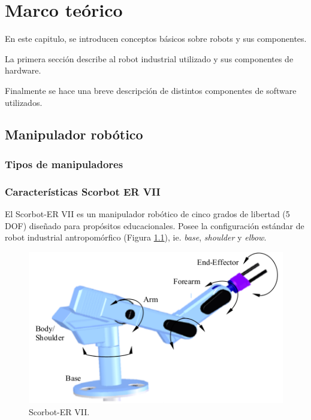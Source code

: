 \chapter{Marco teórico}

En este capitulo, se introducen conceptos básicos sobre robots y sus componentes.

La primera sección describe al robot industrial utilizado y sus componentes de hardware.

Finalmente se hace una breve descripción de distintos componentes de software utilizados.


\section{Manipulador robótico}



\subsection{Tipos de manipuladores}

\subsection{Características Scorbot ER VII}

El Scorbot-ER VII es un  manipulador robótico de cinco grados de libertad (5 DOF) diseñado para propósitos educacionales. Posee la configuración estándar de robot industrial antropomórfico (Figura \ref{cap2_scorbot}), ie. \textit{base}, \textit{shoulder} y \textit{elbow}.

\begin{figure}[ht]
  \centering
  \includegraphics[scale=0.5]{img/cap2/scorbot}
  \caption{Scorbot-ER VII.}
  \label{cap2_scorbot}
\end{figure}

